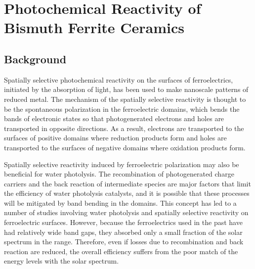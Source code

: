 

\chapter{Photochemical Reactivity of Bismuth Ferrite Ceramics}
\label{ch:bfo}




\section{Background}
\label{sec:ch7background}


Spatially selective photochemical reactivity on the surfaces of ferroelectrics, initiated
by the absorption of  light, has been used to make nanoscale patterns of reduced
metal.\cite{Giocondi:2001gz,Hanson:2006bq,Kalinin:2002iw,Tiwari:2009jv} The mechanism of
the spatially selective reactivity is thought to be the spontaneous polarization in the
ferroelectric domains, which bends the bands of electronic states so that photogenerated
electrons and holes are transported in opposite
directions.\cite{Anonymous:2011wc,FRIDKIN:1984tg} As a result, electrons are transported
to the surfaces of positive domains where reduction products form and holes are
transported to the surfaces of negative domains where oxidation products
form.\cite{Giocondi:2001gz,Burbure:2010go,Giocondi:2001bi,Burbure:2010ti,Bhardwaj:2010eh,Dunn:2007ja}

Spatially selective reactivity induced by ferroelectric polarization may also be
beneficial for water photolysis. The recombination of photogenerated charge carriers and
the back reaction of intermediate species are major factors that limit the efficiency of
water photolysis catalysts,\cite{Kudo:2008fk,Domen:1996um} and it is possible that these
processes will be mitigated by band bending in the domains. This concept has led to a
number of studies involving water
photolysis\cite{Inoue:2009bh,Inoue:1990vc,Anonymous:lTM5YSKy} and spatially selective
reactivity on ferroelectric
surfaces.\cite{Giocondi:2001gz,Burbure:2010go,Giocondi:2001bi,Burbure:2010ti,Bhardwaj:2010eh,%
Giocondi:2008ja,Bhardwaj:2010ef} However, because the ferroelectrics used in the
past have had relatively wide band gaps, they absorbed only a small fraction of the solar
spectrum in the  range. Therefore, even if losses due to recombination and back
reaction are reduced, the overall efficiency suffers from the poor match of the energy
levels with the solar spectrum.

